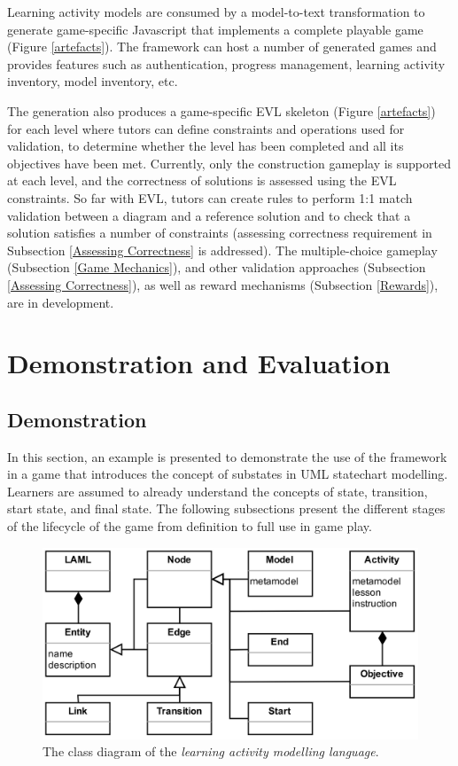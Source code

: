 \documentclass[12pt, a4paper]{report} \usepackage[titletoc]{appendix}
\begin{document}
Learning activity models are consumed by a model-to-text transformation to generate game-specific Javascript that implements a complete playable game (Figure \ref{artefacts}). The framework can host a number of generated games and provides features such as authentication, progress management, learning activity inventory, model inventory, etc.  

The generation also produces a game-specific EVL skeleton (Figure \ref{artefacts}) for each level where tutors can define constraints and operations used for validation, to determine whether the level has been completed and all its objectives have been met. Currently, only the construction gameplay is supported at each level, and the correctness of solutions is assessed using the EVL constraints. So far with EVL, tutors can create rules to perform 1:1 match validation between a diagram and a reference solution and to check that a solution satisfies a number of constraints (assessing correctness requirement in Subsection \ref{Assessing Correctness} is addressed). The multiple-choice gameplay (Subsection \ref{Game Mechanics}), and other validation approaches (Subsection \ref{Assessing Correctness}), as well as reward mechanisms (Subsection \ref{Rewards}), are in development. 


\section{Demonstration and Evaluation}

\subsection{Demonstration}
In this section, an example is presented to demonstrate the use of the framework in a game that introduces the concept of substates in UML statechart modelling. Learners are assumed to already understand the concepts of state, transition, start state, and final state. The following subsections present the different stages of the lifecycle of the game from definition to full use in game play.

\begin{figure}[t!]
\centering
\includegraphics[width=12cm]{laml}
\caption{The class diagram of the \emph{learning activity modelling language}.}
\label{laml}
\end{figure}
\end{document}

